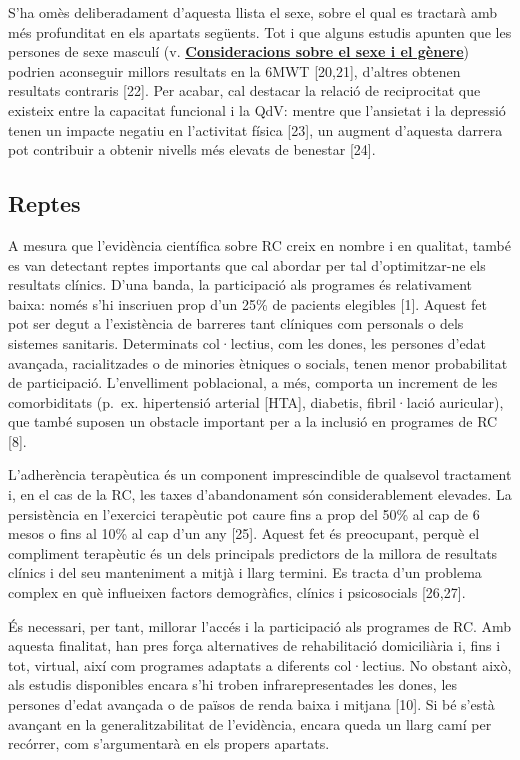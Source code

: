 \documentclass[CAT]{TFUOC}%
\begin{document}
S'ha omès deliberadament d'aquesta llista el sexe, sobre el qual es tractarà amb més profunditat en els apartats següents. Tot i que alguns estudis apunten que les persones de sexe masculí (v. \textbf{\hyperref[consideracions-sobre-el-sexe-i-el-guxe8nere]{Consideracions sobre el sexe i el gènere}}) podrien aconseguir millors resultats en la 6MWT {[}20,21{]}, d'altres obtenen resultats contraris {[}22{]}. Per acabar, cal destacar la relació de reciprocitat que existeix entre la capacitat funcional i la QdV: mentre que l'ansietat i la depressió tenen un impacte negatiu en l'activitat física {[}23{]}, un augment d'aquesta darrera pot contribuir a obtenir nivells més elevats de benestar {[}24{]}.

\subsection{Reptes}\label{reptes}

A mesura que l'evidència científica sobre RC creix en nombre i en qualitat, també es van detectant reptes importants que cal abordar per tal d'optimitzar-ne els resultats clínics. D'una banda, la participació als programes és relativament baixa: només s'hi inscriuen prop d'un 25\% de pacients elegibles {[}1{]}. Aquest fet pot ser degut a l'existència de barreres tant clíniques com personals o dels sistemes sanitaris. Determinats col·lectius, com les dones, les persones d'edat avançada, racialitzades o de minories ètniques o socials, tenen menor probabilitat de participació. L'envelliment poblacional, a més, comporta un increment de les comorbiditats (p.~ex. hipertensió arterial {[}HTA{]}, diabetis, fibril·lació auricular), que també suposen un obstacle important per a la inclusió en programes de RC {[}8{]}.

L'adherència terapèutica és un component imprescindible de qualsevol tractament i, en el cas de la RC, les taxes d'abandonament són considerablement elevades. La persistència en l'exercici terapèutic pot caure fins a prop del 50\% al cap de 6 mesos o fins al 10\% al cap d'un any {[}25{]}. Aquest fet és preocupant, perquè el compliment terapèutic és un dels principals predictors de la millora de resultats clínics i del seu manteniment a mitjà i llarg termini. Es tracta d'un problema complex en què influeixen factors demogràfics, clínics i psicosocials {[}26,27{]}.

És necessari, per tant, millorar l'accés i la participació als programes de RC. Amb aquesta finalitat, han pres força alternatives de rehabilitació domiciliària i, fins i tot, virtual, així com programes adaptats a diferents col·lectius. No obstant això, als estudis disponibles encara s'hi troben infrarepresentades les dones, les persones d'edat avançada o de països de renda baixa i mitjana {[}10{]}. Si bé s'està avançant en la generalitzabilitat de l'evidència, encara queda un llarg camí per recórrer, com s'argumentarà en els propers apartats.
\end{document}
